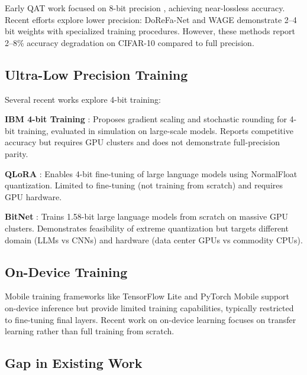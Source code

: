 \documentclass[conference]{IEEEtran}
\begin{document}
Early QAT work focused on 8-bit precision \cite{krishnamoorthi2018quantizing, wu2018training}, achieving near-lossless accuracy. Recent efforts explore lower precision: DoReFa-Net \cite{zhou2016dorefa} and WAGE \cite{wu2018training} demonstrate 2--4 bit weights with specialized training procedures. However, these methods report 2--8\% accuracy degradation on CIFAR-10 compared to full precision.

\subsection{Ultra-Low Precision Training}
Several recent works explore 4-bit training:

\textbf{IBM 4-bit Training} \cite{sun2020ultra}: Proposes gradient scaling and stochastic rounding for 4-bit training, evaluated in simulation on large-scale models. Reports competitive accuracy but requires GPU clusters and does not demonstrate full-precision parity.

\textbf{QLoRA} \cite{dettmers2023qlora}: Enables 4-bit fine-tuning of large language models using NormalFloat quantization. Limited to fine-tuning (not training from scratch) and requires GPU hardware.

\textbf{BitNet} \cite{wang2023bitnet}: Trains 1.58-bit large language models from scratch on massive GPU clusters. Demonstrates feasibility of extreme quantization but targets different domain (LLMs vs CNNs) and hardware (data center GPUs vs commodity CPUs).

\subsection{On-Device Training}
Mobile training frameworks like TensorFlow Lite \cite{tensorflowlite} and PyTorch Mobile support on-device inference but provide limited training capabilities, typically restricted to fine-tuning final layers. Recent work on on-device learning \cite{cai2020tinytl, lin2022device} focuses on transfer learning rather than full training from scratch.

\subsection{Gap in Existing Work}
\end{document}
